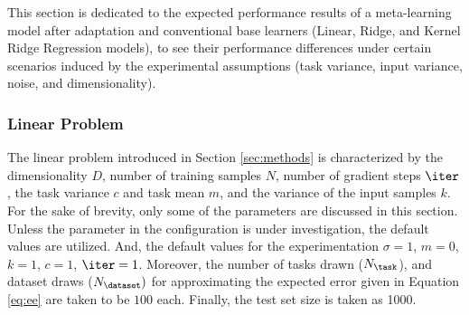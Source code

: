 This section is dedicated to the expected performance results of a meta-learning model after adaptation and conventional base learners (\eg Linear, Ridge, and Kernel Ridge Regression models), to see their performance differences under certain scenarios induced by the experimental assumptions (\eg task variance, input variance, noise, and dimensionality). 

\subsubsection{Linear Problem}
The linear problem introduced in Section \ref{sec:methods} is characterized by the dimensionality $D$, number of training samples $N$, number of gradient steps $\iter$, the task variance $c$ and task mean $m$, and the variance of the input samples $k$. For the sake of brevity, only some of the parameters are discussed in this section. Unless the parameter in the configuration is under investigation, the default values are utilized. And, the default values for the experimentation $\sigma=1$, $m=0$, $k=1$, $c=1$, $\iter=1$.
Moreover, the number of tasks drawn ($N_{\task}$), and dataset draws ($N_{\dataset})$  for approximating the expected error given in Equation \ref{eq:ee} are taken to be $100$ each. Finally, the test set size is taken as 1000.


